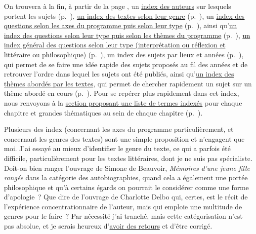 On trouvera à la fin, à partir de la page \pageref{indexdeb}, un \hyperlink{indexa}{index des auteurs} sur lesquels portent les sujets (p.~\pageref{indexa}), \hyperlink{indexg}{un index des textes selon leur genre} (p.~\pageref{indexg}), 
un \hyperlink{indexw}{index des questions selon les axes du programme puis selon leur type} (p.~\pageref{indexw}), ainsi qu'\hyperlink{indexv}{un index des questions selon leur type puis selon les thèmes du programme} (p.~\pageref{indexv}), \hyperlink{indexq}{un index général des questions selon leur type (interprétation ou réflexion et littéraire ou philosophique)} (p.~\pageref{indexq}), un \hyperlink{indexn}{index des sujets par lieux et années} (p.~\pageref{indexn}), qui permet de se faire une idée rapide des sujets proposés au fil des années et de retrouver l'ordre dans lequel les sujets ont été publiés,  ainsi qu'\hyperlink{indext}{un index des thèmes abordés par les textes}, qui permet de chercher rapidement un sujet sur un thème abordé en cours (p.~\pageref{indext}). Pour se repérer plus rapidement dans cet index, nous renvoyons à la \hyperlink{repere-thematique}{section proposant une liste de termes indexés} pour chaque chapitre et grandes thématiques au sein de chaque chapitre (p.~\pageref{repere-thematique}).

Plusieurs des index (concernant les axes du programme particulièrement, et concernant les genres des textes)
sont une simple proposition et n'engagent que moi.
J'ai essayé au mieux d'identifier le genre du texte, ce qui a parfois été difficile,
particulièrement pour les textes littéraires, dont je ne suis pas spécialiste.
Doit-on bien ranger l'ouvrage de Simone de Beauvoir, \textit{Mémoires d'une jeune fille rangée} dans la catégorie des autobiographies, quand cela a également une portée philosophique et qu'à certains égards on pourrait le considérer comme une forme d'apologie~? Que dire de l'ouvrage de Charlotte Delbo qui, certes, est le récit de l'expérience concentrationnaire de l'auteur, mais qui emploie une multitude de genres pour le faire~? Par nécessité j'ai tranché, mais cette catégorisation n'est pas absolue, et je serais heureux 
d'\href{mailto:mikael.quesseveur@ac-lille.fr}{avoir des retours}
et d'être corrigé.

